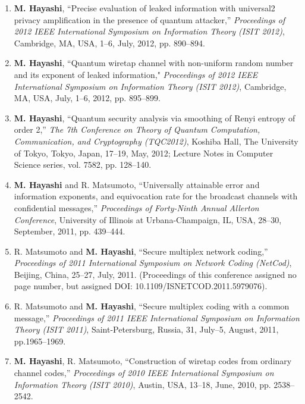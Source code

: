\documentclass[a4paper,12pt,oneside]{article}
\begin{document}
\begin{enumerate}
\item 
\textbf{M. Hayashi}, 
``Precise evaluation of leaked information with universal2 privacy amplification in the presence of quantum attacker,'' 
{\em Proceedings of 2012 IEEE International Symposium on Information Theory (ISIT 2012)}, 
Cambridge, MA, USA, 1--6, July, 2012, pp. 890--894. 

\item   \textbf{M. Hayashi}, 
``Quantum wiretap channel with non-uniform random number and its exponent of leaked information," 
{\em Proceedings of 2012 IEEE International Symposium on Information Theory (ISIT 2012)}, 
Cambridge, MA, USA, July, 1--6, 2012, pp. 895--899. 

\item   \textbf{M. Hayashi}, 
``Quantum security analysis via smoothing of Renyi entropy of order 2,''
{\em The 7th Conference on Theory of Quantum Computation, Communication, and Cryptography (TQC2012)}, 
Koshiba Hall, The University of Tokyo, Tokyo, Japan, 17--19, May, 2012; 
Lecture Notes in Computer Science series, vol. 7582, pp. 128--140.

\item   \textbf{M. Hayashi} and R. Matsumoto, 
``Universally attainable error and information exponents, and equivocation rate for the broadcast channels with confidential messages,''
{\em Proceedings of Forty-Ninth Annual Allerton Conference}, 
University of Illinois at Urbana-Champaign, IL, USA, 28--30, September, 2011, pp. 439--444. 

\item   R. Matsumoto and \textbf{M. Hayashi}, 
``Secure multiplex network coding,'' 
{\em Proceedings of 2011 International Symposium on Network Coding (NetCod)}, 
Beijing, China, 25--27, July, 2011.
(Proceedings of this conference assigned no page number, but assigned DOI: 10.1109/ISNETCOD.2011.5979076).

\item R. Matsumoto and \textbf{M. Hayashi}, 
``Secure multiplex coding with a common message,'' 
{\em Proceedings of 2011 IEEE International Symposium on Information Theory (ISIT 2011)}, 
Saint-Petersburg, Russia, 31, July--5, August, 2011, pp.1965--1969.

\item   \textbf{M. Hayashi}, R. Matsumoto, 
``Construction of wiretap codes from ordinary channel codes,'' 
{\em Proceedings of 2010 IEEE International Symposium on Information Theory (ISIT 2010)}, 
Austin, USA, 13--18, June, 2010, pp. 2538--2542.


\end{enumerate}
\end{document}
